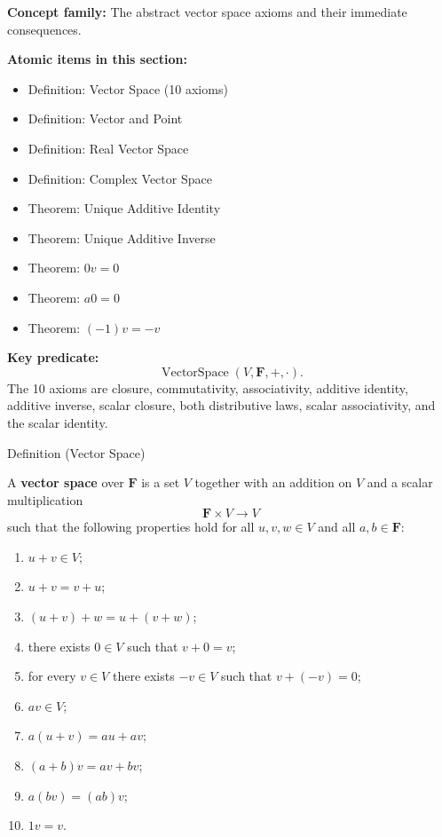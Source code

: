 
\begin{remark*}
\textbf{Concept family:} The abstract vector space axioms and their immediate
consequences.

\medskip
\textbf{Atomic items in this section:}
\begin{itemize}
  \item Definition: Vector Space (10 axioms)
  \item Definition: Vector and Point
  \item Definition: Real Vector Space
  \item Definition: Complex Vector Space
  \item Theorem: Unique Additive Identity
  \item Theorem: Unique Additive Inverse
  \item Theorem: $0v = 0$
  \item Theorem: $a0 = 0$
  \item Theorem: $(-1)v = -v$
\end{itemize}

\medskip
\textbf{Key predicate:}
\[
  \operatorname{VectorSpace}(V, \mathbf{F}, +, \cdot).
\]
The 10 axioms are closure, commutativity, associativity, additive identity,
additive inverse, scalar closure, both distributive laws, scalar associativity,
and the scalar identity.
\end{remark*}


\begin{definitionbox}{Definition (Vector Space)}
\begin{definition}
\label{def:vector-space}
A \textbf{vector space} over $\mathbf{F}$ is a set $V$ together with an
addition on $V$ and a scalar multiplication
\[
\mathbf{F} \times V \to V
\]
such that the following properties hold for all $u,v,w \in V$ and all
$a,b \in \mathbf{F}$:
\begin{enumerate}[label=(\roman*)]
  \item $u + v \in V$;
  \item $u + v = v + u$;
  \item $(u + v) + w = u + (v + w)$;
  \item there exists $0 \in V$ such that $v + 0 = v$;
  \item for every $v \in V$ there exists $-v \in V$ such that
        $v + (-v) = 0$;
  \item $av \in V$;
  \item $a(u+v) = au + av$;
  \item $(a+b)v = av + bv$;
  \item $a(bv) = (ab)v$;
  \item $1v = v$.
\end{enumerate}
\end{definition}
\end{definitionbox}

